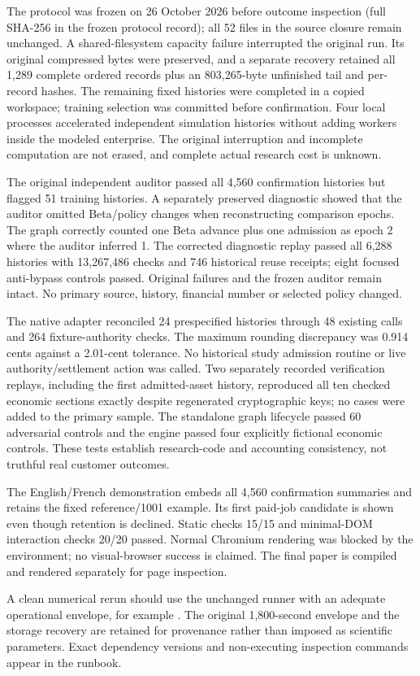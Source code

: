 The protocol was frozen on 26 October 2026 before outcome inspection (full SHA-256 in the frozen protocol record); all 52 files in the source closure remain unchanged. A shared-filesystem capacity failure interrupted the original run. Its original compressed bytes were preserved, and a separate recovery retained all 1,289 complete ordered records plus an 803,265-byte unfinished tail and per-record hashes. The remaining fixed histories were completed in a copied workspace; training selection was committed before confirmation. Four local processes accelerated independent simulation histories without adding workers inside the modeled enterprise. The original interruption and incomplete computation are not erased, and complete actual research cost is unknown.

The original independent auditor passed all 4,560 confirmation histories but flagged 51 training histories. A separately preserved diagnostic showed that the auditor omitted Beta/policy changes when reconstructing comparison epochs. The graph correctly counted one Beta advance plus one admission as epoch 2 where the auditor inferred 1. The corrected diagnostic replay passed all 6,288 histories with 13,267,486 checks and 746 historical reuse receipts; eight focused anti-bypass controls passed. Original failures and the frozen auditor remain intact. No primary source, history, financial number or selected policy changed.

The native adapter reconciled 24 prespecified histories through 48 existing  calls and 264 fixture-authority checks. The maximum rounding discrepancy was 0.914 cents against a 2.01-cent tolerance. No historical study admission routine or live authority/settlement action was called. Two separately recorded verification replays, including the first admitted-asset history, reproduced all ten checked economic sections exactly despite regenerated cryptographic keys; no cases were added to the primary sample. The standalone graph lifecycle passed 60 adversarial controls and the engine passed four explicitly fictional economic controls. These tests establish research-code and accounting consistency, not truthful real customer outcomes.

The English/French demonstration embeds all 4,560 confirmation summaries and retains the fixed reference/1001 example. Its first paid-job candidate is shown even though retention is declined. Static checks 15/15 and minimal-DOM interaction checks 20/20 passed. Normal Chromium rendering was blocked by the environment; no visual-browser success is claimed. The final paper is compiled and rendered separately for page inspection.

A clean numerical rerun should use the unchanged runner with an adequate operational envelope, for example . The original 1,800-second envelope and the storage recovery are retained for provenance rather than imposed as scientific parameters. Exact dependency versions and non-executing inspection commands appear in the runbook.
